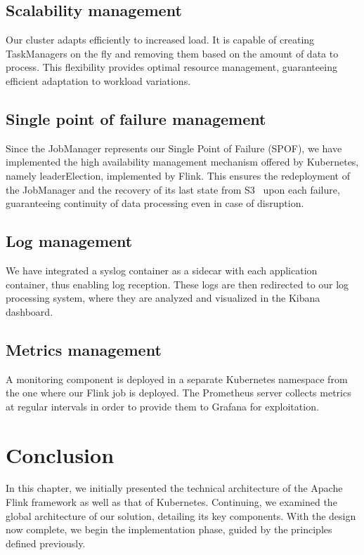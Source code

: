 \subsection{Scalability management}
Our cluster adapts efficiently to increased load.
It is capable of creating TaskManagers on the fly and removing them based on the amount of data to process.
This flexibility provides optimal resource management, guaranteeing efficient adaptation to workload variations.

\subsection{Single point of failure management}
Since the JobManager represents our Single Point of Failure (SPOF), we have implemented the high availability management mechanism offered by Kubernetes, namely leaderElection, implemented by Flink.
This ensures the redeployment of the JobManager and the recovery of its last state from S3~\cite{s3} upon each failure, guaranteeing continuity of data processing even in case of disruption.

\subsection{Log management}
We have integrated a syslog container as a sidecar with each application container, thus enabling log reception.
These logs are then redirected to our log processing system, where they are analyzed and visualized in the Kibana dashboard.

\subsection{Metrics management}
A monitoring component is deployed in a separate Kubernetes namespace from the one where our Flink job is deployed.
The Prometheus server collects metrics at regular intervals in order to provide them to Grafana for exploitation.

\section*{Conclusion}
In this chapter, we initially presented the technical architecture of the Apache Flink framework as well as that of Kubernetes.
Continuing, we examined the global architecture of our solution, detailing its key components.
With the design now complete, we begin the implementation phase, guided by the principles defined previously.
